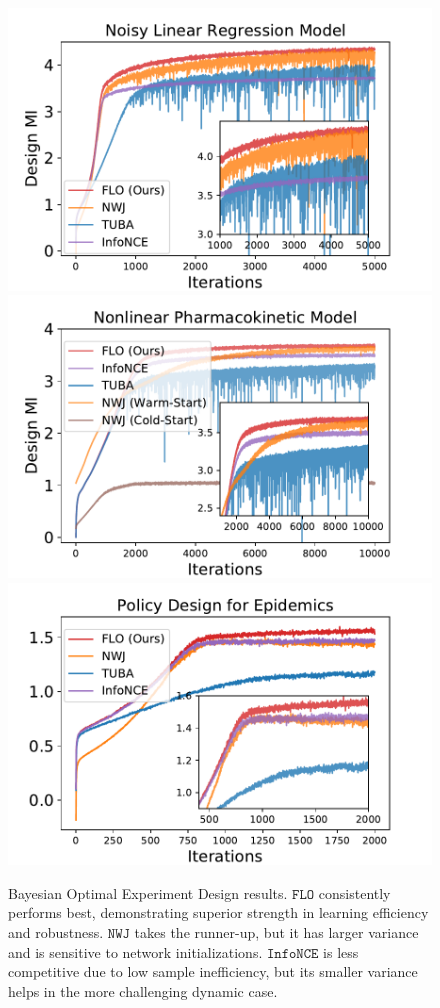 \documentclass{article}
\theoremstyle{plain}
\theoremstyle{definition}
\theoremstyle{remark}
\newcommand{\infonce}{\texttt{InfoNCE}}
\newcommand{\NWJ}{\texttt{NWJ}}
\newcommand{\FLO}{\texttt{FLO}}
\begin{document}
		
		\begin{figure}[t!]
			\begin{center}
				\includegraphics[width=.335\textwidth,trim={0 0 .5in 0},clip]{figures/design/Bayesian}
				\includegraphics[width=.306\textwidth,trim={.5in 0 .5in 0},clip]{figures/design/Bayesianphar}
				\includegraphics[width=.32\textwidth,trim={.3in 0 .5in 0},clip]{figures/design/SIRLoss}
			\end{center}
			\vspace{-1.em}
			\caption{Bayesian Optimal Experiment Design results. $\FLO$ consistently performs best, demonstrating superior strength in learning efficiency and robustness. $\NWJ$ takes the runner-up, but it has larger variance and is sensitive to network initializations. $\infonce$ is less competitive due to low sample inefficiency, but its smaller variance helps in the more challenging dynamic case. 
				\label{fig:design}}
			\vspace{-1.5em}
		\end{figure}
		
\end{document}
